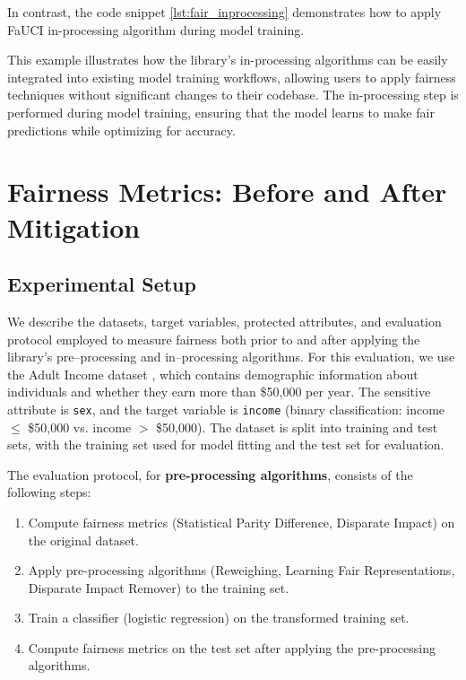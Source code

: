 \documentclass[12pt,a4paper,openright,twoside]{book}
\begin{document}


In contrast, the code snippet \ref{lst:fair_inprocessing} demonstrates how to apply FaUCI in-processing algorithm during model training.



This example illustrates how the library's in-processing algorithms can be easily integrated into existing model training workflows, allowing users to apply fairness techniques without significant changes to their codebase. The in-processing step is performed during model training, ensuring that the model learns to make fair predictions while optimizing for accuracy.

\section{Fairness Metrics: Before and After Mitigation}
\subsection{Experimental Setup}
We describe the datasets, target variables, protected attributes, and evaluation protocol employed to measure fairness both prior to and after applying the library's pre--processing and in--processing algorithms. For this evaluation, we use the Adult Income dataset \cite{adultDataset}, which contains demographic information about individuals and whether they earn more than \$50,000 per year. The sensitive attribute is \texttt{sex}, and the target variable is \texttt{income} (binary classification: income $\leq$ \$50,000 vs. income $>$ \$50,000). The dataset is split into training and test sets, with the training set used for model fitting and the test set for evaluation.

The evaluation protocol, for \textbf{pre-processing algorithms}, consists of the following steps:
\begin{enumerate}
    \item Compute fairness metrics (Statistical Parity Difference, Disparate Impact) on the original dataset.
    \item Apply pre-processing algorithms (Reweighing, Learning Fair Representations, Disparate Impact Remover) to the training set.
    \item Train a classifier (logistic regression) on the transformed training set.
    \item Compute fairness metrics on the test set after applying the pre-processing algorithms.
\end{enumerate}
\end{document}
